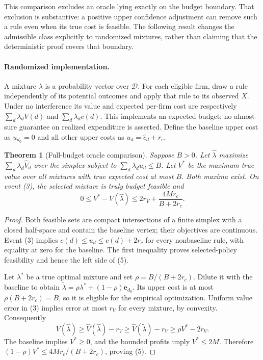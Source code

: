 \documentclass[11pt]{article}
\newtheorem{theorem}{Theorem}
\theoremstyle{definition}
\begin{document}
This comparison excludes an oracle lying exactly on the budget boundary. That exclusion is substantive: a positive upper confidence adjustment can remove such a rule even when its true cost is feasible. The following result changes the admissible class explicitly to randomized mixtures, rather than claiming that the deterministic proof covers that boundary.

\paragraph{Randomized implementation.}
A mixture $\lambda$ is a probability vector over $\mathcal D$. For each eligible firm, draw a rule independently of its potential outcomes and apply that rule to its observed $X$. Under no interference its value and expected per-firm cost are respectively $\sum_d\lambda_dV(d)$ and $\sum_d\lambda_dc(d)$. This implements an expected budget; no almost-sure guarantee on realized expenditure is asserted. Define the baseline upper cost as $u_{d_0}=0$ and all other upper costs as $u_d=\widehat c_d+r_c$.

\begin{theorem}[Full-budget oracle comparison]
Suppose $B>0$. Let $\widehat\lambda$ maximize $\sum_d\lambda_d\widehat V_d$ over the simplex subject to $\sum_d\lambda_du_d\leq B$. Let $V^*$ be the maximum true value over all mixtures with true expected cost at most $B$. Both maxima exist. On event (3), the selected mixture is truly budget feasible and
\[
 0\leq V^*-V(\widehat\lambda)
 \leq 2r_V+\frac{4Mr_c}{B+2r_c}.
 \tag{5}
\]
\end{theorem}
\begin{proof}
Both feasible sets are compact intersections of a finite simplex with a closed half-space and contain the baseline vertex; their objectives are continuous. Event (3) implies $c(d)\leq u_d\leq c(d)+2r_c$ for every nonbaseline rule, with equality at zero for the baseline. The first inequality proves selected-policy feasibility and hence the left side of (5).

Let $\lambda^*$ be a true optimal mixture and set $\rho=B/(B+2r_c)$. Dilute it with the baseline to obtain $\widetilde\lambda=\rho\lambda^*+(1-\rho)\mathbf e_{d_0}$. Its upper cost is at most $\rho(B+2r_c)=B$, so it is eligible for the empirical optimization. Uniform value error in (3) implies error at most $r_V$ for every mixture, by convexity. Consequently
\[
 V(\widehat\lambda)\geq\widehat V(\widehat\lambda)-r_V
 \geq\widehat V(\widetilde\lambda)-r_V
 \geq\rho V^*-2r_V.
\]
The baseline implies $V^*\geq0$, and the bounded profits imply $V^*\leq2M$. Therefore $(1-\rho)V^*\leq4Mr_c/(B+2r_c)$, proving (5).
\end{proof}
\end{document}
